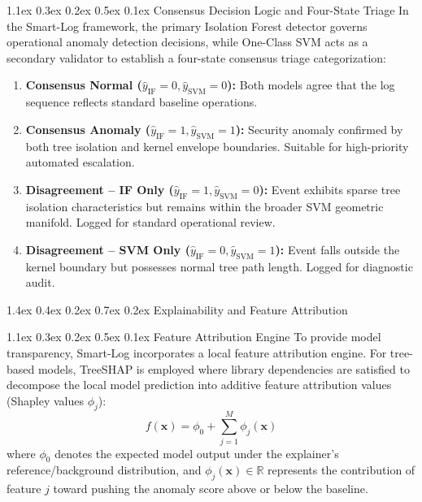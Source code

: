 \documentclass[10pt,conference]{IEEEtran}
\makeatletter
\renewcommand\section{\@startsection{section}{1}{\z@}%
  {1.4ex \@plus 0.4ex \@minus 0.2ex}%
  {0.7ex \@plus 0.2ex}%
  {\normalfont\fontsize{12pt}{14.4pt}\selectfont\bfseries\centering}}
\renewcommand\subsection{\@startsection{subsection}{2}{\z@}%
  {1.1ex \@plus 0.3ex \@minus 0.2ex}%
  {0.5ex \@plus 0.1ex}%
  {\normalfont\fontsize{12pt}{14.4pt}\selectfont\bfseries}}
\makeatother
\begin{document}
\subsection{Consensus Decision Logic and Four-State Triage}
In the Smart-Log framework, the primary Isolation Forest detector governs operational anomaly detection decisions, while One-Class SVM acts as a secondary validator to establish a four-state consensus triage categorization:
\begin{enumerate}
\item \textbf{Consensus Normal ($\hat{y}_{\text{IF}} = 0, \hat{y}_{\text{SVM}} = 0$):} Both models agree that the log sequence reflects standard baseline operations.
\item \textbf{Consensus Anomaly ($\hat{y}_{\text{IF}} = 1, \hat{y}_{\text{SVM}} = 1$):} Security anomaly confirmed by both tree isolation and kernel envelope boundaries. Suitable for high-priority automated escalation.
\item \textbf{Disagreement -- IF Only ($\hat{y}_{\text{IF}} = 1, \hat{y}_{\text{SVM}} = 0$):} Event exhibits sparse tree isolation characteristics but remains within the broader SVM geometric manifold. Logged for standard operational review.
\item \textbf{Disagreement -- SVM Only ($\hat{y}_{\text{IF}} = 0, \hat{y}_{\text{SVM}} = 1$):} Event falls outside the kernel boundary but possesses normal tree path length. Logged for diagnostic audit.
\end{enumerate}

\section{Explainability and Feature Attribution}
\label{sec:explainability}

\subsection{Feature Attribution Engine}
To provide model transparency, Smart-Log incorporates a local feature attribution engine. For tree-based models, TreeSHAP is employed where library dependencies are satisfied to decompose the local model prediction into additive feature attribution values (Shapley values $\phi_j$):
\begin{equation}
f(\mathbf{x}) = \phi_0 + \sum_{j=1}^{M} \phi_j(\mathbf{x})
\label{eq_shap}
\end{equation}
where $\phi_0$ denotes the expected model output under the explainer's reference/background distribution, and $\phi_j(\mathbf{x}) \in \mathbb{R}$ represents the contribution of feature $j$ toward pushing the anomaly score above or below the baseline.
\end{document}
